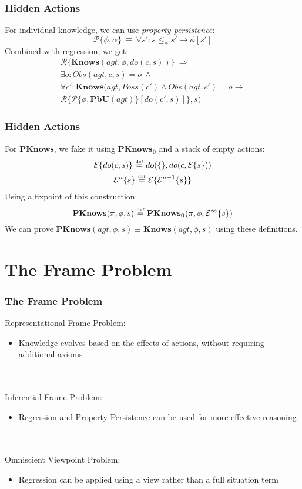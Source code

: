 \documentclass{beamer}
\newcommand{\isdef}{\hbox{$\stackrel{\mbox{\tiny def}}{=}$}}
\begin{document}
\begin{frame}
\frametitle{Hidden Actions}
For individual knowledge, we can use \emph{property persistence}:
\begin{equation*}
\mathcal{P}\{\phi,\alpha\}\ \equiv\ \forall s': s \leq_{\alpha} s' \rightarrow \phi[s']
\end{equation*}
Combined with regression, we get:
\begin{multline*}
\mathcal{R}\{\mathbf{Knows}(agt,\phi,do(c,s))\}\ \Rightarrow \\
\exists o: Obs(agt,c,s)=o\ \wedge\\
\forall c': \mathbf{Knows}(agt,Poss(c') \wedge Obs(agt,c')=o \rightarrow \\
 \mathcal{R}\{\mathcal{P}\{\phi,\mathbf{PbU}(agt)\}[do(c',s)]\},s)
\end{multline*}
\end{frame}

\begin{frame}
\frametitle{Hidden Actions}
For $\mathbf{PKnows}$, we fake it using $\mathbf{PKnows_0}$ and a stack of empty actions:
\begin{gather*}
\mathcal{E}\{do(c,s)\}\ \isdef\ do(\{\},do(c,\mathcal{E}\{s\})) \\
\mathcal{E}^n\{s\}\ \isdef\ \mathcal{E}\{\mathcal{E}^{n-1}\{s\}\}
\end{gather*}
Using a fixpoint of this construction:
\begin{equation*}
\mathbf{PKnows}(\pi,\phi,s)\ \isdef\ \mathbf{PKnows_0}(\pi,\phi,\mathcal{E}^{\infty}\{s\})
\end{equation*}
We can prove $\mathbf{PKnows}(agt,\phi,s) \equiv \mathbf{Knows}(agt,\phi,s)$ using these definitions.
\end{frame}

\section{The Frame Problem}

\begin{frame}
\frametitle{The Frame Problem}
Representational Frame Problem:
\begin{itemize}
\item Knowledge evolves based on the effects of actions, without requiring additional axioms
\end{itemize}
\ \\
\ \\
Inferential Frame Problem:
\begin{itemize}
\item Regression and Property Persistence can be used for more effective reasoning
\end{itemize}
\ \\
\ \\
Omniscient Viewpoint Problem:
\begin{itemize}
\item Regression can be applied using a view rather than a full situation term
\end{itemize}
\end{frame}
\end{document}
